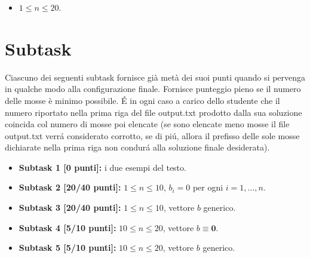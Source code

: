 \begin{itemize}[nolistsep, noitemsep]
  \item $1 \le n \le 20$.
\end{itemize}
  
\section*{Subtask}
Ciascuno dei seguenti subtask fornisce gi\`a met\`a
dei suoi punti quando si pervenga in qualche modo alla configurazione finale.
Fornisce punteggio pieno se il numero delle mosse è minimo possibile.
\'E in ogni caso a carico dello studente che il numero riportato nella prima riga del file {\sc output.txt} prodotto dalla sua soluzione coincida col numero di mosse poi elencate (se sono elencate meno mosse il file {\sc output.txt} verr\'a considerato corrotto, se di pi\'u, allora il prefisso delle sole mosse dichiarate nella prima riga non condur\'a alla soluzione finale desiderata).

  \begin{itemize}
    \item \textbf{Subtask 1 [0 punti]:} i due esempi del testo.
    \item \textbf{Subtask 2 [20/40 punti]:} $1 \le n \le 10$, $b_i=0$ per ogni $i=1,\ldots, n$.
    \item \textbf{Subtask 3 [20/40 punti]:} $1 \le n \le 10$, vettore $b$ generico.
    \item \textbf{Subtask 4 [5/10 punti]:} $10 \le n \le 20$, vettore $b\equiv \mathbf{0}$.
    \item \textbf{Subtask 5 [5/10 punti]:} $10 \le n \le 20$, vettore $b$ generico.
  \end{itemize}
  

